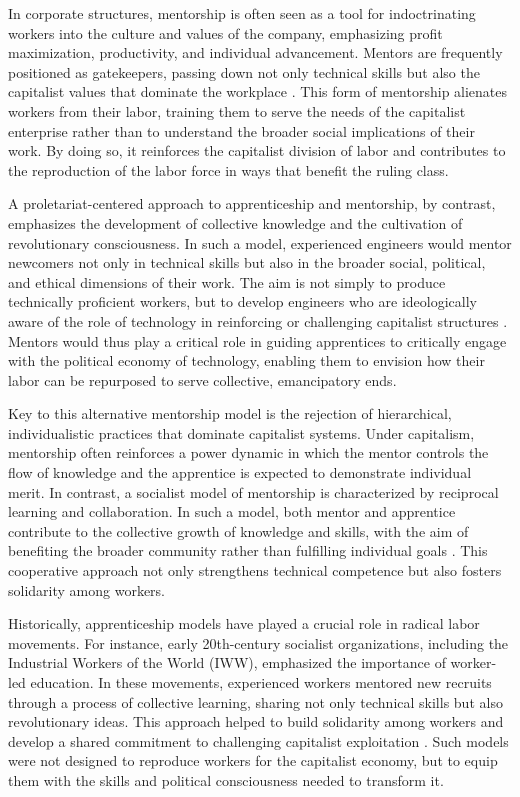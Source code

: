 \begin{refsection}
In corporate structures, mentorship is often seen as a tool for indoctrinating workers into the culture and values of the company, emphasizing profit maximization, productivity, and individual advancement. Mentors are frequently positioned as gatekeepers, passing down not only technical skills but also the capitalist values that dominate the workplace \cite[pp.~95]{marx2008capital}. This form of mentorship alienates workers from their labor, training them to serve the needs of the capitalist enterprise rather than to understand the broader social implications of their work. By doing so, it reinforces the capitalist division of labor and contributes to the reproduction of the labor force in ways that benefit the ruling class.

A proletariat-centered approach to apprenticeship and mentorship, by contrast, emphasizes the development of collective knowledge and the cultivation of revolutionary consciousness. In such a model, experienced engineers would mentor newcomers not only in technical skills but also in the broader social, political, and ethical dimensions of their work. The aim is not simply to produce technically proficient workers, but to develop engineers who are ideologically aware of the role of technology in reinforcing or challenging capitalist structures \cite[pp.~45]{marx1974communist}. Mentors would thus play a critical role in guiding apprentices to critically engage with the political economy of technology, enabling them to envision how their labor can be repurposed to serve collective, emancipatory ends.

Key to this alternative mentorship model is the rejection of hierarchical, individualistic practices that dominate capitalist systems. Under capitalism, mentorship often reinforces a power dynamic in which the mentor controls the flow of knowledge and the apprentice is expected to demonstrate individual merit. In contrast, a socialist model of mentorship is characterized by reciprocal learning and collaboration. In such a model, both mentor and apprentice contribute to the collective growth of knowledge and skills, with the aim of benefiting the broader community rather than fulfilling individual goals \cite[pp.~58]{noble2019algorithms}. This cooperative approach not only strengthens technical competence but also fosters solidarity among workers.

Historically, apprenticeship models have played a crucial role in radical labor movements. For instance, early 20th-century socialist organizations, including the Industrial Workers of the World (IWW), emphasized the importance of worker-led education. In these movements, experienced workers mentored new recruits through a process of collective learning, sharing not only technical skills but also revolutionary ideas. This approach helped to build solidarity among workers and develop a shared commitment to challenging capitalist exploitation \cite[pp.~45]{adams1995education}. Such models were not designed to reproduce workers for the capitalist economy, but to equip them with the skills and political consciousness needed to transform it.


\end{refsection}
